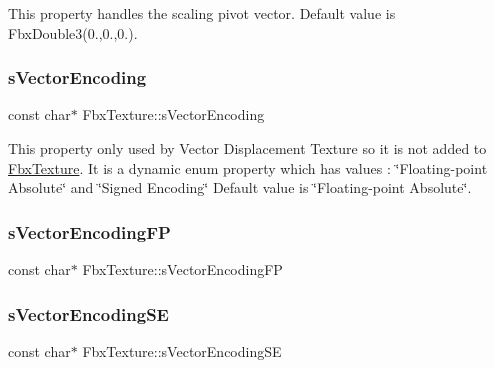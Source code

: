 This property handles the scaling pivot vector. Default value is Fbx\+Double3(0.,0.,0.). \mbox{\label{class_fbx_texture_ae8aca07710aa872fa8964408101f8a5b}} 
\subsubsection{\texorpdfstring{s\+Vector\+Encoding}{sVectorEncoding}}
{\footnotesize\ttfamily const char$\ast$ Fbx\+Texture\+::s\+Vector\+Encoding\hspace{0.3cm}{\ttfamily [static]}}

This property only used by Vector Displacement Texture so it is not added to \hyperlink{class_fbx_texture}{Fbx\+Texture}. It is a dynamic enum property which has values \+: \char`\"{}\+Floating-\/point Absolute\char`\"{} and \char`\"{}\+Signed Encoding\char`\"{} Default value is \char`\"{}\+Floating-\/point Absolute\char`\"{}. \mbox{\label{class_fbx_texture_a5cd9b07db0e8ee5792511c50626f442b}} 
\subsubsection{\texorpdfstring{s\+Vector\+Encoding\+FP}{sVectorEncodingFP}}
{\footnotesize\ttfamily const char$\ast$ Fbx\+Texture\+::s\+Vector\+Encoding\+FP\hspace{0.3cm}{\ttfamily [static]}}

\mbox{\label{class_fbx_texture_a4f12c4756b837abd121c25662bd61009}} 
\subsubsection{\texorpdfstring{s\+Vector\+Encoding\+SE}{sVectorEncodingSE}}
{\footnotesize\ttfamily const char$\ast$ Fbx\+Texture\+::s\+Vector\+Encoding\+SE\hspace{0.3cm}{\ttfamily [static]}}

